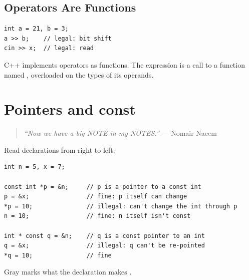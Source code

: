 \subsection{Operators Are Functions}
\begin{lstlisting}[style=cpp]
int a = 21, b = 3;
a >> b;    // legal: bit shift
cin >> x;  // legal: read
\end{lstlisting}
C++ implements operators as functions. The expression  is a call
to a function named , overloaded on the types of its operands.

\section{Pointers and const}
\begin{quote}
\textit{``Now we have a big NOTE in my NOTES.''} --- Nomair Naeem
\end{quote}
Read declarations from right to left:
\begin{lstlisting}[style=cpp]
int n = 5, x = 7;

const int *p = &n;     // p is a pointer to a const int
p = &x;                // fine: p itself can change
*p = 10;               // illegal: can't change the int through p
n = 10;                // fine: n itself isn't const

int * const q = &n;    // q is a const pointer to an int
q = &x;                // illegal: q can't be re-pointed
*q = 10;               // fine
\end{lstlisting}
\begin{center}

\small Gray marks what the declaration makes .
\end{center}

